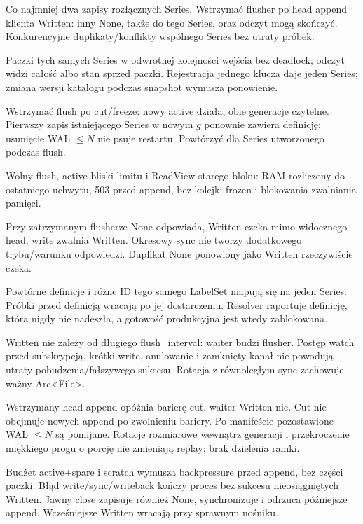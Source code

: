 \documentclass[11pt,a4paper]{article}
\begin{document}
\begin{description}[style=multiline,leftmargin=16mm,font=\bfseries]
\item[T-12:] Co najmniej dwa zapisy rozłącznych Series.
Wstrzymać flusher po head append klienta Written: inny None,
także do tego Series, oraz odczyt mogą skończyć.
Konkurencyjne duplikaty/konflikty wspólnego Series bez utraty próbek.
\item[T-13:] Paczki tych samych Series w odwrotnej kolejności wejścia
bez deadlock; odczyt widzi całość albo stan sprzed paczki.
Rejestracja jednego klucza daje jeden Series; zmiana wersji katalogu
podczas snapshot wymusza ponowienie.
\item[T-14:] Wstrzymać flush po cut/freeze: nowy active działa,
obie generacje czytelne. Pierwszy zapis istniejącego Series w nowym $g$
ponownie zawiera definicję; usunięcie WAL $\leq N$ nie psuje restartu.
Powtórzyć dla Series utworzonego podczas flush.
\item[T-15:] Wolny flush, active bliski limitu i ReadView starego bloku:
RAM rozliczony do ostatniego uchwytu, 503 przed append,
bez kolejki frozen i blokowania zwalniania pamięci.
\item[T-16:] Przy zatrzymanym flusherze None odpowiada,
Written czeka mimo widocznego head; write zwalnia Written.
Okresowy sync nie tworzy dodatkowego trybu/warunku odpowiedzi.
Duplikat None ponowiony jako Written rzeczywiście czeka.
\item[T-17:] Powtórne definicje i różne ID tego samego LabelSet mapują się
na jeden Series. Próbki przed definicją wracają po jej dostarczeniu.
Resolver raportuje definicję, która nigdy nie nadeszła, a gotowość
produkcyjna jest wtedy zablokowana.
\item[T-18:] Written nie zależy od długiego flush\_interval:
waiter budzi flusher. Postęp watch przed subskrypcją, krótki write,
anulowanie i zamknięty kanał nie powodują utraty pobudzenia/fałszywego sukcesu.
Rotacja z równoległym sync zachowuje ważny Arc<File>.
\item[T-19:] Wstrzymany head append opóźnia barierę cut, waiter Written nie.
Cut nie obejmuje nowych append po zwolnieniu bariery.
Po manifeście pozostawione WAL $\leq N$ są pomijane.
Rotacje rozmiarowe wewnątrz generacji i przekroczenie miękkiego progu
o porcję nie zmieniają replay; brak dzielenia ramki.
\item[T-20:] Budżet active+spare i scratch wymusza backpressure przed append,
bez części paczki. Błąd write/sync/writeback kończy proces bez sukcesu
nieosiągniętych Written. Jawny close zapisuje również None, synchronizuje
i odrzuca późniejsze append. Wcześniejsze Written wracają przy sprawnym nośniku.
\end{description}
\end{document}
